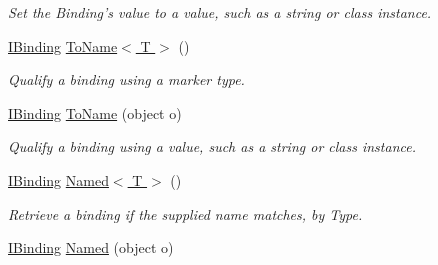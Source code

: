 \begin{DoxyCompactItemize}
\begin{DoxyCompactList}\small\item\em Set the Binding's value to a value, such as a string or class instance. \end{DoxyCompactList}\item 
\hypertarget{interfacestrange_1_1framework_1_1api_1_1_i_binding_a1a5c45805f5877e6b85dea9e468f3d72}{\hyperlink{interfacestrange_1_1framework_1_1api_1_1_i_binding}{I\-Binding} \hyperlink{interfacestrange_1_1framework_1_1api_1_1_i_binding_a1a5c45805f5877e6b85dea9e468f3d72}{To\-Name$<$ T $>$} ()}\label{interfacestrange_1_1framework_1_1api_1_1_i_binding_a1a5c45805f5877e6b85dea9e468f3d72}

\begin{DoxyCompactList}\small\item\em Qualify a binding using a marker type. \end{DoxyCompactList}\item 
\hypertarget{interfacestrange_1_1framework_1_1api_1_1_i_binding_a675e49e47712163dea9b1b73f920ddc0}{\hyperlink{interfacestrange_1_1framework_1_1api_1_1_i_binding}{I\-Binding} \hyperlink{interfacestrange_1_1framework_1_1api_1_1_i_binding_a675e49e47712163dea9b1b73f920ddc0}{To\-Name} (object o)}\label{interfacestrange_1_1framework_1_1api_1_1_i_binding_a675e49e47712163dea9b1b73f920ddc0}

\begin{DoxyCompactList}\small\item\em Qualify a binding using a value, such as a string or class instance. \end{DoxyCompactList}\item 
\hypertarget{interfacestrange_1_1framework_1_1api_1_1_i_binding_a1f984da3846ebea1b1e9e82da7ba71d1}{\hyperlink{interfacestrange_1_1framework_1_1api_1_1_i_binding}{I\-Binding} \hyperlink{interfacestrange_1_1framework_1_1api_1_1_i_binding_a1f984da3846ebea1b1e9e82da7ba71d1}{Named$<$ T $>$} ()}\label{interfacestrange_1_1framework_1_1api_1_1_i_binding_a1f984da3846ebea1b1e9e82da7ba71d1}

\begin{DoxyCompactList}\small\item\em Retrieve a binding if the supplied name matches, by Type. \end{DoxyCompactList}\item 
\hypertarget{interfacestrange_1_1framework_1_1api_1_1_i_binding_ad901d3311ad66928a950f70543f77829}{\hyperlink{interfacestrange_1_1framework_1_1api_1_1_i_binding}{I\-Binding} \hyperlink{interfacestrange_1_1framework_1_1api_1_1_i_binding_ad901d3311ad66928a950f70543f77829}{Named} (object o)}\label{interfacestrange_1_1framework_1_1api_1_1_i_binding_ad901d3311ad66928a950f70543f77829}


\end{DoxyCompactItemize}
